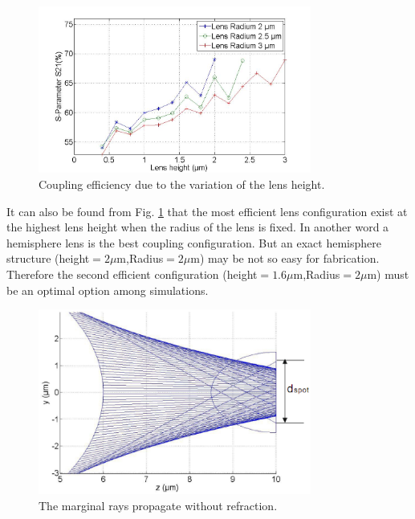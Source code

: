 \begin{figure}[!ht]
\centering
\includegraphics[width=0.8\textwidth]{bilder/s21_fix_lens_radium_hxx}
\caption{Coupling efficiency due to the variation of the lens height.}
\label{fig:coupling_lenses_curve_hxx}
\end{figure}
It can also be found from Fig. \ref{fig:coupling_lenses_curve_hxx} that the most efficient lens configuration exist at the highest lens height when the radius of the lens is fixed. In another word a hemisphere lens is the best coupling configuration. But an exact hemisphere structure (height$=2\mu$m,Radius$=2\mu$m) may be not so easy for fabrication. Therefore the second efficient configuration (height$=1.6\mu$m,Radius$=2\mu$m) must be  an optimal option among simulations.\\ 
\begin{figure}[!ht]
\centering
\includegraphics[width=0.8\textwidth]{bilder/beam_ray_without_refract}
\caption{The marginal rays propagate without refraction.}
\label{fig:matlab_coupling_lenses_rxx}
\end{figure}
